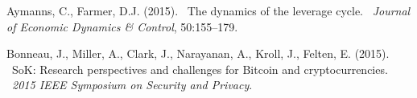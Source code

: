 \documentclass[10pt]{article}
\def\newblock{\ }%
\begin{document}
\begin{thebibliography}{}
	
	Aymanns, C., Farmer, D.J. (2015).
	\newblock The dynamics of the leverage cycle.
	\newblock {\em Journal of Economic Dynamics \& Control}, 50:155--179.
	
	Bonneau, J., Miller, A., Clark, J., Narayanan, A., Kroll, J., Felten, E. (2015).
	\newblock SoK: Research perspectives and challenges for Bitcoin and cryptocurrencies.
	\newblock {\em 2015 IEEE Symposium on Security and Privacy}.
	
\end{thebibliography}
\end{document}
